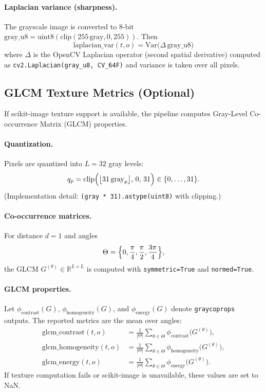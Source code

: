 \paragraph{Laplacian variance (sharpness).}
The grayscale image is converted to 8-bit
$\mathrm{gray\_u8} = \mathrm{uint8}(\mathrm{clip}(255\,\mathrm{gray},0,255))$.
Then
\begin{equation}
\mathrm{laplacian\_var}(t,o) = \mathrm{Var}\bigl(\Delta\,\mathrm{gray\_u8}\bigr)
\end{equation}
where $\Delta$ is the OpenCV Laplacian operator (second spatial derivative) computed as
\texttt{cv2.Laplacian(gray\_u8, CV\_64F)} and variance is taken over all pixels.

\subsection{GLCM Texture Metrics (Optional)}

If scikit-image texture support is available, the pipeline computes Gray-Level Co-occurrence Matrix (GLCM) properties.

\paragraph{Quantization.}
Pixels are quantized into $L=32$ gray levels:
\begin{equation}
q_p = \mathrm{clip}\Bigl(\bigl\lfloor 31\,\mathrm{gray}_p\bigr\rfloor,\,0,\,31\Bigr)\in\{0,\dots,31\}.
\end{equation}
(Implementation detail: \texttt{(gray * 31).astype(uint8)} with clipping.)

\paragraph{Co-occurrence matrices.}
For distance $d=1$ and angles
\begin{equation}
\Theta = \Bigl\{0,\frac{\pi}{4},\frac{\pi}{2},\frac{3\pi}{4}\Bigr\},
\end{equation}
the GLCM $G^{(\theta)}\in\mathbb{R}^{L\times L}$ is computed with
\texttt{symmetric=True} and \texttt{normed=True}.

\paragraph{GLCM properties.}
Let $\phi_{\mathrm{contrast}}(G)$, $\phi_{\mathrm{homogeneity}}(G)$, and $\phi_{\mathrm{energy}}(G)$
denote \texttt{graycoprops} outputs. The reported metrics are the mean over angles:
\begin{align}
\mathrm{glcm\_contrast}(t,o) &= \frac{1}{|\Theta|}\sum_{\theta\in\Theta} \phi_{\mathrm{contrast}}\bigl(G^{(\theta)}\bigr),\\
\mathrm{glcm\_homogeneity}(t,o) &= \frac{1}{|\Theta|}\sum_{\theta\in\Theta} \phi_{\mathrm{homogeneity}}\bigl(G^{(\theta)}\bigr),\\
\mathrm{glcm\_energy}(t,o) &= \frac{1}{|\Theta|}\sum_{\theta\in\Theta} \phi_{\mathrm{energy}}\bigl(G^{(\theta)}\bigr).
\end{align}
If texture computation fails or scikit-image is unavailable, these values are set to NaN.

